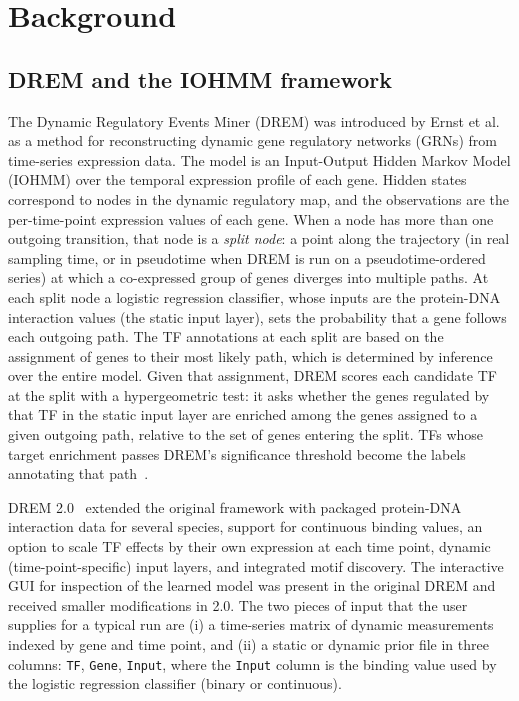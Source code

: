 
\section{Background}
\label{sec:background}

\subsection{DREM and the IOHMM framework}

The Dynamic Regulatory Events Miner (DREM) was introduced by Ernst et al.~\cite{ernst2007dremoriginal} as a method for reconstructing dynamic gene regulatory networks (GRNs) from time-series expression data. The model is an Input-Output Hidden Markov Model (IOHMM) over the temporal expression profile of each gene. Hidden states correspond to nodes in the dynamic regulatory map, and the observations are the per-time-point expression values of each gene. When a node has more than one outgoing transition, that node is a \emph{split node}: a point along the trajectory (in real sampling time, or in pseudotime when DREM is run on a pseudotime-ordered series) at which a co-expressed group of genes diverges into multiple paths. At each split node a logistic regression classifier, whose inputs are the protein-DNA interaction values (the static input layer), sets the probability that a gene follows each outgoing path. The TF annotations at each split are based on the assignment of genes to their most likely path, which is determined by inference over the entire model. Given that assignment, DREM scores each candidate TF at the split with a hypergeometric test: it asks whether the genes regulated by that TF in the static input layer are enriched among the genes assigned to a given outgoing path, relative to the set of genes entering the split. TFs whose target enrichment passes DREM's significance threshold become the labels annotating that path~\cite{ernst2007dremoriginal, schulz2012drem2}.

DREM 2.0~\cite{schulz2012drem2} extended the original framework with packaged protein-DNA interaction data for several species, support for continuous binding values, an option to scale TF effects by their own expression at each time point, dynamic (time-point-specific) input layers, and integrated motif discovery. The interactive GUI for inspection of the learned model was present in the original DREM and received smaller modifications in 2.0. The two pieces of input that the user supplies for a typical run are (i) a time-series matrix of dynamic measurements indexed by gene and time point, and (ii) a static or dynamic prior file in three columns: \texttt{TF}, \texttt{Gene}, \texttt{Input}, where the \texttt{Input} column is the binding value used by the logistic regression classifier (binary or continuous).

